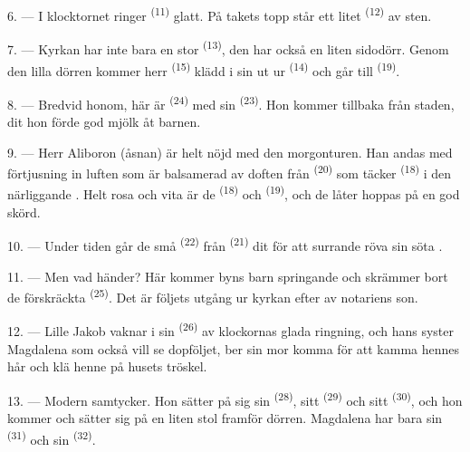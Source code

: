 6. --- I klocktornet ringer  \textsuperscript{(11)} glatt. På takets topp
står ett litet  \textsuperscript{(12)} av sten.

7. --- Kyrkan har inte bara en stor  \textsuperscript{(13)}, den har också en
liten sidodörr. Genom den lilla dörren kommer herr
 \textsuperscript{(15)} klädd i sin  ut ur
 \textsuperscript{(14)} och går till 
\textsuperscript{(19)}.

8. --- Bredvid honom, här är  \textsuperscript{(24)} med sin
 \textsuperscript{(23)}. Hon kommer tillbaka från staden, dit hon
förde god mjölk åt barnen.

\VUsaut{4.0mm}
\VUsaut{3.4mm}

9. --- Herr Aliboron (åsnan) är helt nöjd med den morgonturen. Han andas med förtjusning in
luften som är balsamerad av doften från  \textsuperscript{(20)} som täcker
 \textsuperscript{(18)} i den närliggande . Helt
rosa och vita är de
 \textsuperscript{(18)} och 
\textsuperscript{(19)}, och de låter hoppas på en god skörd.

10. --- Under tiden går de små  \textsuperscript{(22)} från
 \textsuperscript{(21)} dit för att surrande röva sin söta
.

11. --- Men vad händer? Här kommer byns barn springande och skrämmer bort de förskräckta
 \textsuperscript{(25)}. Det är följets utgång ur kyrkan efter 
av notariens son.

12. --- Lille Jakob vaknar i sin  \textsuperscript{(26)} av klockornas glada
ringning, och hans syster Magdalena som också vill se dopföljet, ber sin mor komma för att
kamma hennes hår och klä henne på husets tröskel.

13. --- Modern samtycker. Hon sätter på sig sin  \textsuperscript{(28)}, sitt
 \textsuperscript{(29)} och sitt
 \textsuperscript{(30)}, och hon kommer och sätter sig på en
liten stol framför dörren. Magdalena har bara sin  \textsuperscript{(31)}
och sin  \textsuperscript{(32)}.

